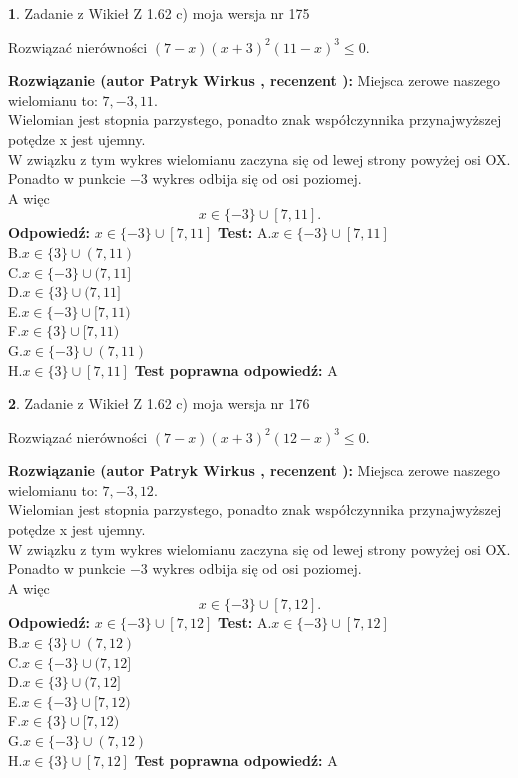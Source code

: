 \documentclass[12pt, a4paper]{article}
\theoremstyle{definition} %
\newtheorem{zad}{}
\newcommand{\zadStart}[1]{\begin{zad}#1\newline}
\newcommand{\zadStop}{\end{zad}}
\newcommand{\rozwStart}[2]{\noindent \textbf{Rozwiązanie (autor #1 , recenzent #2): }\newline}
\newcommand{\rozwStop}{\newline}
\newcommand{\odpStart}{\noindent \textbf{Odpowiedź:}\newline}
\newcommand{\odpStop}{\newline}
\newcommand{\testStart}{\noindent \textbf{Test:}\newline}
\newcommand{\testStop}{\newline}
\newcommand{\kluczStart}{\noindent \textbf{Test poprawna odpowiedź:}\newline}
\newcommand{\kluczStop}{\newline}
\begin{document}
\zadStart{Zadanie z Wikieł Z 1.62 c) moja wersja nr 175}

Rozwiązać nierówności $(7-x)(x+3)^{2}(11-x)^{3}\le0$.
\zadStop
\rozwStart{Patryk Wirkus}{}
Miejsca zerowe naszego wielomianu to: $7, -3, 11$.\\
Wielomian jest stopnia parzystego, ponadto znak współczynnika przy\linebreak najwyższej potędze x jest ujemny.\\ W związku z tym wykres wielomianu zaczyna się od lewej strony powyżej osi OX.\\
Ponadto w punkcie $-3$ wykres odbija się od osi poziomej.\\
A więc $$x \in \{-3\} \cup [7,11].$$
\rozwStop
\odpStart
$x \in \{-3\} \cup [7,11]$
\odpStop
\testStart
A.$x \in \{-3\} \cup [7,11]$\\
B.$x \in \{3\} \cup (7,11)$\\
C.$x \in \{-3\} \cup (7,11]$\\
D.$x \in \{3\} \cup (7,11]$\\
E.$x \in \{-3\} \cup [7,11)$\\
F.$x \in \{3\} \cup [7,11)$\\
G.$x \in \{-3\} \cup (7,11)$\\
H.$x \in \{3\} \cup [7,11]$
\testStop
\kluczStart
A
\kluczStop



\zadStart{Zadanie z Wikieł Z 1.62 c) moja wersja nr 176}

Rozwiązać nierówności $(7-x)(x+3)^{2}(12-x)^{3}\le0$.
\zadStop
\rozwStart{Patryk Wirkus}{}
Miejsca zerowe naszego wielomianu to: $7, -3, 12$.\\
Wielomian jest stopnia parzystego, ponadto znak współczynnika przy\linebreak najwyższej potędze x jest ujemny.\\ W związku z tym wykres wielomianu zaczyna się od lewej strony powyżej osi OX.\\
Ponadto w punkcie $-3$ wykres odbija się od osi poziomej.\\
A więc $$x \in \{-3\} \cup [7,12].$$
\rozwStop
\odpStart
$x \in \{-3\} \cup [7,12]$
\odpStop
\testStart
A.$x \in \{-3\} \cup [7,12]$\\
B.$x \in \{3\} \cup (7,12)$\\
C.$x \in \{-3\} \cup (7,12]$\\
D.$x \in \{3\} \cup (7,12]$\\
E.$x \in \{-3\} \cup [7,12)$\\
F.$x \in \{3\} \cup [7,12)$\\
G.$x \in \{-3\} \cup (7,12)$\\
H.$x \in \{3\} \cup [7,12]$
\testStop
\kluczStart
A
\kluczStop
\end{document}
